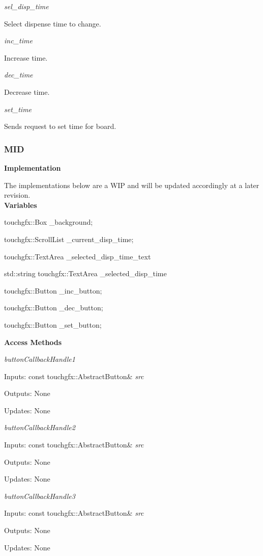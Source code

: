 \documentclass[12pt,titlepage]{article}
\begin{document}
\textit{sel\_disp\_time} \par
Select dispense time to change.

\textit{inc\_time} \par
Increase time.

\textit{dec\_time} \par
Decrease time.

\textit{set\_time} \par
Sends request to set time for board.

\subsubsection*{MID}

\noindent \textbf{Implementation} 

\noindent The implementations below are a WIP and will be updated accordingly at a later revision.\\

\noindent \textbf{Variables}

touchgfx::Box \_background; \par
touchgfx::ScrollList \_current\_disp\_time; \par
touchgfx::TextArea \_selected\_disp\_time\_text \par
std::string touchgfx::TextArea \_selected\_disp\_time \par
touchgfx::Button \_inc\_button; \par
touchgfx::Button \_dec\_button; \par
touchgfx::Button \_set\_button; \newline

\noindent \textbf{Access Methods} 

\textit{buttonCallbackHandle1} \par
Inputs: const touchgfx::AbstractButton& \textit{src} \par
Outputs: None \par
Updates: None \newline

\textit{buttonCallbackHandle2} \par
Inputs: const touchgfx::AbstractButton& \textit{src} \par
Outputs: None \par
Updates: None \newline

\textit{buttonCallbackHandle3} \par
Inputs: const touchgfx::AbstractButton& \textit{src} \par
Outputs: None \par
Updates: None \newline
\end{document}
